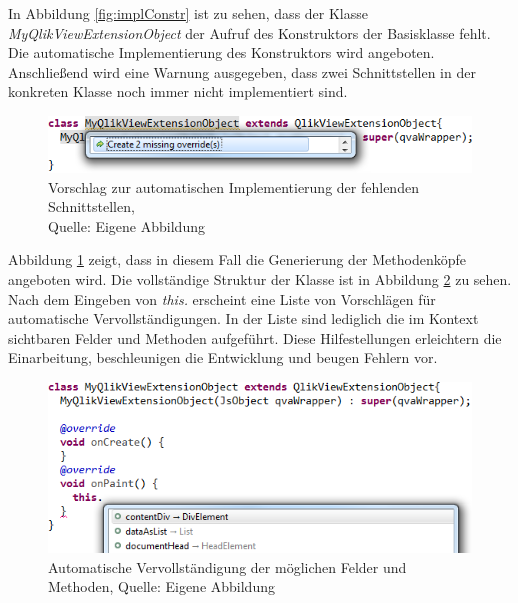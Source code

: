 \begin{appendix}
In Abbildung \ref{fig:implConstr} ist zu sehen, dass der Klasse \textit{MyQlikViewExtensionObject} der Aufruf des Konstruktors der Basisklasse fehlt. Die automatische Implementierung des Konstruktors wird angeboten. Anschließend wird eine Warnung ausgegeben, dass zwei Schnittstellen in der konkreten Klasse noch immer nicht implementiert sind.

\begin{figure}[htbp]
	\centering
		\includegraphics[width=1.00\textwidth]{img/HilfeDurchEditor/implOverride.png}
	\caption[Vorschlag zur automatischen Implementierung der fehlenden Schnittstellen]{Vorschlag zur automatischen Implementierung der fehlenden Schnittstellen, \\Quelle: Eigene Abbildung}
	\label{fig:implOverride}
\end{figure}

Abbildung \ref{fig:implOverride} zeigt, dass in diesem Fall die Generierung der Methodenköpfe angeboten wird. Die vollständige Struktur der Klasse ist in Abbildung \ref{fig:complete} zu sehen. Nach dem Eingeben von \textit{this.} erscheint eine Liste von Vorschlägen für automatische Vervollständigungen. In der Liste sind lediglich die im Kontext sichtbaren Felder und Methoden aufgeführt. Diese Hilfestellungen erleichtern die Einarbeitung, beschleunigen die Entwicklung und beugen Fehlern vor.

\begin{figure}[htbp]
	\centering
		\includegraphics[width=1.00\textwidth]{img/HilfeDurchEditor/complete.png}
	\caption[Automatische Vervollständigung der möglichen Felder und Methoden]{Automatische Vervollständigung der möglichen Felder und Methoden, Quelle: Eigene Abbildung}
	\label{fig:complete}
\end{figure}



\end{appendix} 
